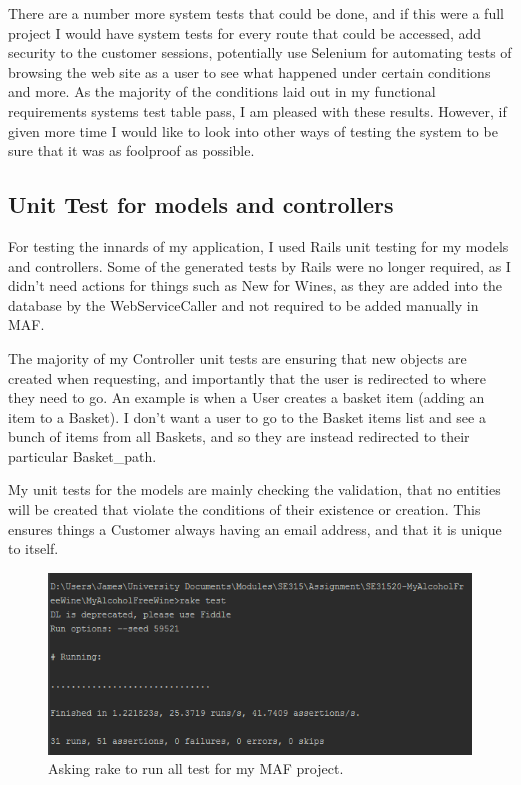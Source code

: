 \documentclass[12pt]{article}
\begin{document}
There are a number more system tests that could be done, and if this were a full project I would have system tests for every route that could be accessed, add security to the customer sessions, potentially use Selenium for automating tests of browsing the web site as a user to see what happened under certain conditions and more. As the majority of the conditions laid out in my functional requirements systems test table pass, I am pleased with these results. However, if given more time I would like to look into other ways of testing the system to be sure that it was as foolproof as possible.

\subsection{Unit Test for models and controllers}
For testing the innards of my application, I used Rails unit testing for my models and controllers. Some of the generated tests by Rails were no longer required, as I didn't need actions for things such as New for Wines, as they are added into the database by the WebServiceCaller and not required to be added manually in MAF.

The majority of my Controller unit tests are ensuring that new objects are created when requesting, and importantly that the user is redirected to where they need to go. An example is when a User creates a basket item (adding an item to a Basket). I don't want a user to go to the Basket items list and see a bunch of items from all Baskets, and so they are instead redirected to their particular Basket\_path.

My unit tests for the models are mainly checking the validation, that no entities will be created that violate the conditions of their existence or creation. This ensures things a Customer always having an email address, and that it is unique to itself. 

\begin{figure}[H]
        \centering
                \includegraphics[width=1\textwidth]{assets/unit_test}
                \caption{Asking rake to run all test for my MAF project.}
                \label{fig: running tests.} 
\end{figure}
\end{document}
